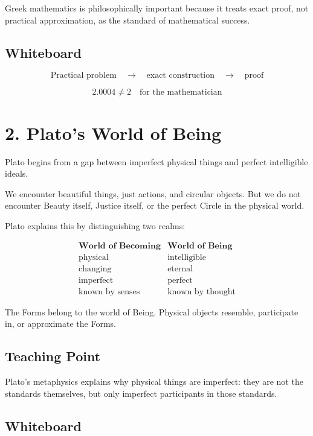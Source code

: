 \documentclass[11pt]{article}
\begin{document}
Greek mathematics is philosophically important because it treats exact proof, not practical
approximation, as the standard of mathematical success.

\subsection*{Whiteboard}

\[
\text{Practical problem}
\quad \longrightarrow \quad
\text{exact construction}
\quad \longrightarrow \quad
\text{proof}
\]

\[
2.0004 \neq 2
\quad
\text{for the mathematician}
\]

\section*{2. Plato's World of Being}

Plato begins from a gap between imperfect physical things and perfect intelligible ideals.

We encounter beautiful things, just actions, and circular objects. But we do not encounter
Beauty itself, Justice itself, or the perfect Circle in the physical world.

Plato explains this by distinguishing two realms:

\[
\begin{array}{c|c}
\textbf{World of Becoming} & \textbf{World of Being} \\
\hline
\text{physical} & \text{intelligible} \\
\text{changing} & \text{eternal} \\
\text{imperfect} & \text{perfect} \\
\text{known by senses} & \text{known by thought}
\end{array}
\]

The Forms belong to the world of Being. Physical objects resemble, participate in, or
approximate the Forms.

\subsection*{Teaching Point}

Plato's metaphysics explains why physical things are imperfect: they are not the standards
themselves, but only imperfect participants in those standards.

\subsection*{Whiteboard}
\end{document}
